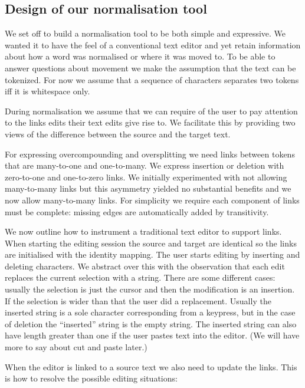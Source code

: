 \documentclass[10pt, a4paper]{article}
\begin{document}
\subsection{Design of our normalisation tool}

We set off to build a normalisation tool to be both simple and expressive.
We wanted it to have the feel of a conventional text editor and yet retain
information about how a word was normalised or where it was moved to.
To be able to answer questions about movement we make the assumption that
the text can be tokenized. For now we assume that a sequence of characters
separates two tokens iff it is whitespace only.

During normalisation we assume that we can require of the user to pay attention
to the links edits their text edits give rise to. We facilitate this by
providing two views of the difference between the source and the target text.

For expressing overcompounding and oversplitting we need links between tokens
that are many-to-one and one-to-many. We express insertion or deletion with
zero-to-one and one-to-zero links. We initially experimented with not allowing
many-to-many links but this asymmetry yielded no substantial benefits
and we now allow many-to-many links.
For simplicity we require each component
of links must be complete: missing edges are automatically added by
transitivity.

We now outline how to instrument a traditional text editor to support links.
When starting the editing session the source and target are identical so the
links are initialised with the identity mapping. The user starts editing
by inserting and deleting characters. We abstract over this with the observation
that each edit replaces the current selection with a string. There are
some different cases: usually the selection is just the cursor and then the
modification is an insertion. If the selection is wider than that the user
did a replacement. Usually the inserted string is a sole character corresponding
from a keypress, but in the case of deletion the ``inserted'' string is the
empty string. The inserted string can also have length greater than one
if the user pastes text into the editor. (We will have more to say about
cut and paste later.)

When the editor is linked to a source text we also need to update the links.
This is how to resolve the possible editing situations:
\end{document}
